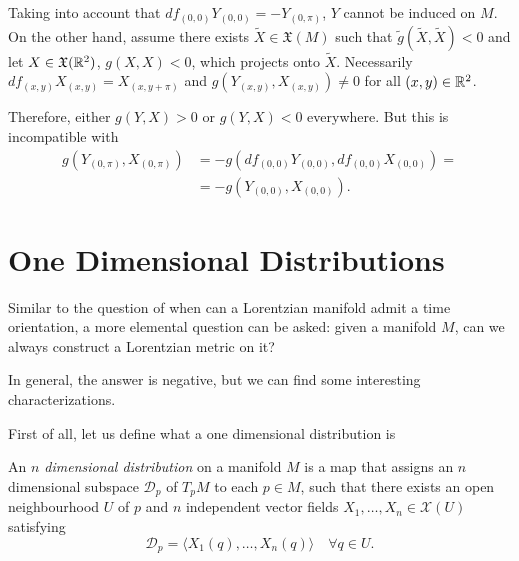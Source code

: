 \begin{example}
	Taking into account that $df_{(0,0)}Y_{(0,0)}=-Y_{(0,\pi)}$, $Y$ cannot be induced on $M$. On the other hand, assume there exists ${\tilde X}\in \mathfrak{X}(M)$ such that ${\tilde g}({\tilde X},{\tilde X})<0$ and let $X\in \mathfrak{X}(\mathbb{R}^2)$, $g(X,X)<0$, which projects onto ${\tilde X}$. Necessarily $df_{(x,y)}X_{(x,y)}=X_{(x,y+\pi)}$ and $g(Y_{(x,y)},X_{(x,y)})\neq 0$ for all $(x,y)\in \mathbb{R}^2$.
	
	Therefore, either $g(Y,X)>0$ or $g(Y,X)<0$ everywhere. But this is incompatible with
	\begin{align*}
		g\left(Y_{(0,\pi)},X_{(0,\pi)}\right) &= -g\left(df_{(0,0)}Y_{(0,0)},df_{(0,0)}X_{(0,0)}\right)=\\
		&= -g\left(Y_{(0,0)},X_{(0,0)}\right).
	\end{align*}
\end{example}

%

\section{One Dimensional Distributions}

Similar to the question of when can a Lorentzian manifold admit a time orientation, a more elemental question can be asked: given a manifold $M$, can we always construct a Lorentzian metric on it?

In general, the answer is negative, but we can find some interesting characterizations.

First of all, let us define what a one dimensional distribution is
\begin{definition}
	An \emph{$n$ dimensional distribution} on a manifold $M$ is a map that assigns an $n$ dimensional subspace $\mathcal{D}_p$ of $T_pM$ to each $p \in M$, such that there exists an open neighbourhood $U$ of $p$ and $n$ independent vector fields $X_1, \dots, X_n \in \mathcal{X}(U)$ satisfying
	\[
		\mathcal{D}_p = \langle X_1(q), \dots, X_n(q) \rangle \quad \forall q \in U.
	\]
\end{definition}

